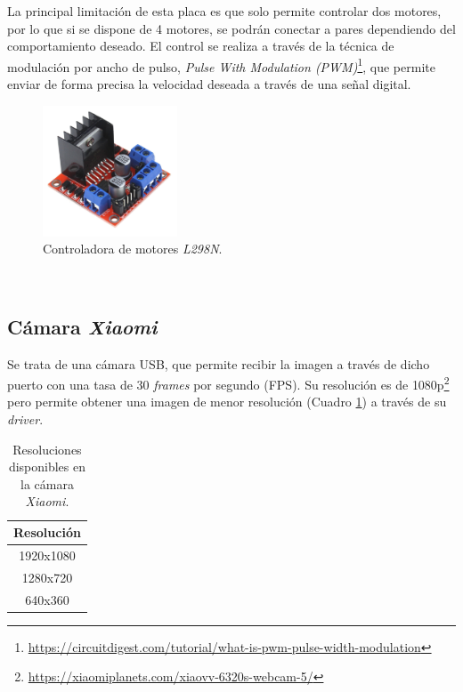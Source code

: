 La principal limitación de esta placa es que solo permite controlar dos motores, por lo que si se dispone de 4 motores, se podrán conectar a pares dependiendo del comportamiento deseado. El control se realiza a través de la técnica de modulación por ancho de pulso, \textit{Pulse With Modulation (PWM)}\footnote{\url{https://circuitdigest.com/tutorial/what-is-pwm-pulse-width-modulation}}, que permite enviar de forma precisa la velocidad deseada a través de una señal digital.\\

\begin{figure} [h!]
	\begin{center}
		\includegraphics[width=4cm]{figs/l298n}
	\end{center}
	\caption{Controladora de motores \textit{L298N}.}
	\label{fig:l298n}
\end{figure}\

\subsection{Cámara \textit{Xiaomi}}
\label{subsection:xiaomicamera}
Se trata de una cámara USB, que permite recibir la imagen a través de dicho puerto con una tasa de 30 \textit{frames} por segundo (FPS). Su resolución es de 1080p\footnote{\url{https://xiaomiplanets.com/xiaovv-6320s-webcam-5/}} pero permite obtener una imagen de menor resolución (Cuadro \ref{table:camera}) a través de su \textit{driver}.\\

\begin{table}[H]
	\begin{center}
		\begin{tabular}{|c|}
			\hline
			\textbf{Resolución}
			\\
			\hline
			1920x1080
			\\
			1280x720
			\\
			640x360
			\\
			\hline
		\end{tabular}
		\caption{Resoluciones disponibles en la cámara \textit{Xiaomi}.}
		\label{table:camera}
	\end{center}
\end{table}

